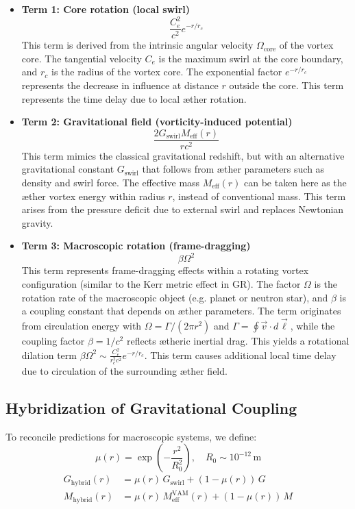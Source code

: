 \begin{itemize}
  \item \textbf{Term 1: Core rotation (local swirl)}
  \[
    \frac{C_e^2}{c^2} e^{-r/r_c}
  \]
  This term is derived from the intrinsic angular velocity $\Omega_\text{core}$ of the vortex core. The tangential velocity $C_e$ is the maximum swirl at the core boundary, and $r_c$ is the radius of the vortex core. The exponential factor $e^{-r/r_c}$ represents the decrease in influence at distance $r$ outside the core. This term represents the time delay due to local æther rotation.

  \item \textbf{Term 2: Gravitational field (vorticity-induced potential)}
  \[
    \frac{2 G_\text{swirl} M_\text{eff}(r)}{r c^2}
  \]
  This term mimics the classical gravitational redshift, but with an alternative gravitational constant $G_\text{swirl}$ that follows from æther parameters such as density and swirl force. The effective mass $M_\text{eff}(r)$ can be taken here as the æther vortex energy within radius $r$, instead of conventional mass. This term arises from the pressure deficit due to external swirl and replaces Newtonian gravity.

  \item \textbf{Term 3: Macroscopic rotation (frame-dragging)}
  \[
    \beta \Omega^2
  \]
  This term represents frame-dragging effects within a rotating vortex configuration (similar to the Kerr metric effect in GR). The factor $\Omega$ is the rotation rate of the macroscopic object (e.g. planet or neutron star), and $\beta$ is a coupling constant that depends on æther parameters. The term originates from circulation energy with $\Omega = \Gamma / (2\pi r^2)$ and $\Gamma = \oint \vec{v} \cdot d\vec{\ell}$, while the coupling factor $\beta = 1/c^2$ reflects ætheric inertial drag. This yields a rotational dilation term $\beta \Omega^2 \sim \frac{C_e^2}{r_c^2 c^2} e^{-r/r_c}$. This term causes additional local time delay due to circulation of the surrounding æther field.

\end{itemize}

\subsection{Hybridization of Gravitational Coupling}

To reconcile predictions for macroscopic systems, we define:
\[
    \mu(r) = \exp\left(-\frac{r^2}{R_0^2}\right), \quad R_0 \sim 10^{-12} \, \mathrm{m}
\]
\begin{align*}
    G_{\text{hybrid}}(r) &= \mu(r) \, G_{\text{swirl}} + (1 - \mu(r)) \, G \\
    M_{\text{hybrid}}(r) &= \mu(r) \, M_{\text{eff}}^\text{VAM}(r) + (1 - \mu(r)) \, M
\end{align*}

